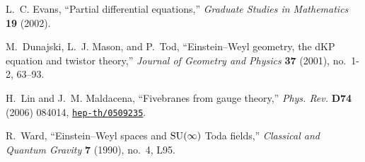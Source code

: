\documentclass[12pt]{article}
\begin{document}
\begin{thebibliography}{10}
L.~C. Evans, ``Partial differential equations,'' {\em Graduate Studies in
  Mathematics} {\bf 19} (2002).

M.~Dunajski, L.~J. Mason, and P.~Tod, ``{Einstein--Weyl geometry, the dKP
  equation and twistor theory},'' {\em Journal of Geometry and Physics} {\bf
  37} (2001), no.~1-2, 63--93.

H.~Lin and J.~M. Maldacena, ``{Fivebranes from gauge theory},'' {\em Phys.
  Rev.} {\bf D74} (2006) 084014,
\href{http://arXiv.org/abs/hep-th/0509235}{{\tt hep-th/0509235}}.


R.~Ward, ``{Einstein--Weyl spaces and ${\rm SU}(\infty)$ Toda fields},'' {\em
  Classical and Quantum Gravity} {\bf 7} (1990), no.~4, L95.

\end{thebibliography}
 

\end{document}
